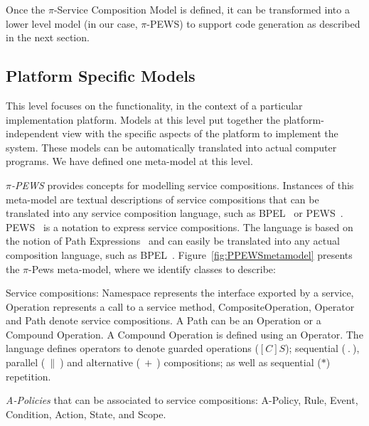 \documentclass{singlecol-new}
\theoremstyle{TH}{
\newtheorem{lemma}{Lemma}
\newtheorem{theorem}[lemma]{Theorem}
\newtheorem{corrolary}[lemma]{Corrolary}
\newtheorem{conjecture}[lemma]{Conjecture}
\newtheorem{proposition}[lemma]{Proposition}
\newtheorem{claim}[lemma]{Claim}
\newtheorem{stheorem}[lemma]{Wrong Theorem}
\newtheorem{algorithm}{Algorithm}
}
\theoremstyle{THrm}{
\newtheorem{definition}{Definition}[section]
\newtheorem{question}{Question}[section]
\newtheorem{remark}{Remark}
\newtheorem{scheme}{Scheme}
}
\theoremstyle{THhit}{
\newtheorem{case}{Case}[section]
}
\theoremstyle{THhsl}{
\newtheorem{example}{Example}
}
\begin{document}
Once the $\pi$-Service Composition Model is defined,  it can be transformed into a lower level model (in our case, $\pi$-PEWS) to support code generation as described in the next section.


\subsection{Platform Specific Models}

This level focuses on the functionality, in the context of a particular implementation platform.
Models at this level put together the platform-independent view with the specific aspects of the platform to implement the system.
These models  can be automatically translated into actual computer programs.
We have defined one meta-model at this level.

\textit{$\pi$-PEWS} provides con\-cepts for modelling service compositions.
Instances of this meta-model are textual descriptions of service compositions that can be translated into any service composition language, such as BPEL~\cite{bpel03} or PEWS~\cite{Placido2010LTPD}.
%
PEWS~\cite{BHM06,Placido2010LTPD} is a notation to express service compositions.
The language is based on the notion of Path Expressions~\cite{And79} and can easily be translated into any actual composition language, such as BPEL~\cite{bpel03}.
Figure~\ref{fig:PPEWSmetamodel} presents the $\pi$-{\sc Pews} meta-model, where we identify classes to describe:

\begin{compactitem}
\item Service compositions: {\sc Namespace} represents the interface exported by a service, {\sc Operation} represents a call to a service method, {\sc CompositeOperation}, {\sc Operator} and {\sc Path}  denote service compositions.
A {\sc Path} can be an {\sc Operation} or a {\sc Compound Operation}.
A {\sc Compound Operation} is defined using an {\sc Operator}.
The language defines operators to denote guarded operations ($[C]S$); sequential ($\ . \ $), parallel ($\ \| \ $) and alternative ($\ + \ $) compositions; as well as sequential ($*$) repetition.
\item {\em A-Policies} that can be associated to service compositions:  {\sc A-Policy}, {\sc Rule}, {\sc Event}, {\sc Condition}, {\sc Action}, {\sc State}, and {\sc Scope}.
\end{compactitem}
\end{document}
